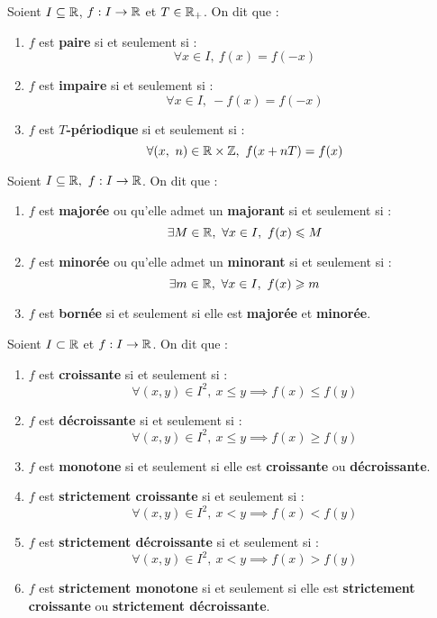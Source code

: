\begin{definition}
	Soient $I \subseteq \mathbb{R}$, $f : I \to \mathbb{R}$ et $T \in \mathbb{R}_+$. On dit que :
    \begin{enumerate}
        \item $f$ est \textbf{paire} si et seulement si : 
        \[ \forall x \in I,\ f(x) = f(-x) \]
        \item $f$ est \textbf{impaire} si et seulement si  :
        \[ \forall x \in I,\ -f(x) = f(-x) \]
        \item $f$ est \textbf{$T$-périodique} si et seulement si :
        \[ \forall (x,\ n) \in \mathbb{R} \times \mathbb{Z},\ f(x + nT) = f(x) \]
    \end{enumerate}
\end{definition}

\begin{definition}
	Soient $I \subseteq \mathbb{R},\ f : I \to \mathbb{R}$. On dit que :
	\begin{enumerate}
	    \item $f$ est \textbf{majorée} ou qu'elle admet un \textbf{majorant} si et seulement si : 
	    \[ \exists M \in \mathbb{R},\ \forall x \in I,\ f(x) \leqslant M \]
        \item $f$ est \textbf{minorée} ou qu'elle admet un \textbf{minorant} si et seulement si :
        \[ \exists m \in \mathbb{R},\ \forall x \in I,\ f(x) \geqslant m \]
        \item $f$ est \textbf{bornée} si et seulement si elle est \textbf{majorée} et \textbf{minorée}.
	\end{enumerate}
\end{definition}

\begin{definition}
	Soient $I \subset \mathbb{R}$ et $f : I \to \mathbb{R}$. On dit que :
    \begin{enumerate}
        \item $f$ est \textbf{croissante} si et seulement si :
        \[ \forall (x, y) \in I^2,\ x \leq y \implies f(x) \leq f(y) \]
        \item $f$ est \textbf{décroissante} si et seulement si : 
        \[ \forall (x, y) \in I^2,\ x \leq y \implies f(x) \geq f(y) \]
        \item $f$ est \textbf{monotone} si et seulement si elle est \textbf{croissante} ou \textbf{décroissante}.
        \item $f$ est \textbf{strictement croissante} si et seulement si : 
        \[ \forall (x, y) \in I^2,\ x < y \implies f(x) < f(y) \]
        \item $f$ est \textbf{strictement décroissante} si et seulement si :
        \[ \forall (x, y) \in I^2,\ x < y \implies f(x) > f(y) \]
        \item $f$ est \textbf{strictement monotone} si et seulement si elle est \textbf{strictement croissante} ou \textbf{strictement décroissante}.
    \end{enumerate}
\end{definition}

